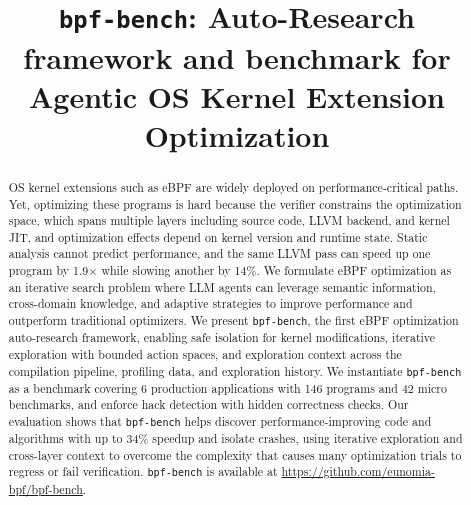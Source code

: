 \documentclass[sigplan,10pt,anonymous,nonacm]{acmart}
\newcommand{\sys}{\texttt{bpf-bench}\xspace}
\begin{document}
\title{\sys: Auto-Research framework and benchmark for Agentic OS Kernel Extension Optimization}


\begin{abstract}
OS kernel extensions such as eBPF are widely deployed on performance-critical paths.
Yet, optimizing these programs is hard because the verifier constrains the optimization space, which spans multiple layers including source code, LLVM backend, and kernel JIT, and optimization effects depend on kernel version and runtime state.
Static analysis cannot predict performance, and the same LLVM pass can speed up one program by 1.9$\times$ while slowing another by 14\%.
We formulate eBPF optimization as an iterative search problem where LLM agents can leverage semantic information, cross-domain knowledge, and adaptive strategies to improve performance and outperform traditional optimizers.
We present \sys, the first eBPF optimization auto-research framework, enabling safe isolation for kernel modifications, iterative exploration with bounded action spaces, and exploration context across the compilation pipeline, profiling data, and exploration history.
We instantiate \sys as a benchmark covering 6 production applications with 146 programs and 42 micro benchmarks, and enforce hack detection with hidden correctness checks.
Our evaluation shows that \sys helps discover performance-improving code and algorithms with up to 34\% speedup and isolate crashes, using iterative exploration and cross-layer context to overcome the complexity that causes many optimization trials to regress or fail verification.
\sys is available at \url{https://github.com/eunomia-bpf/bpf-bench}.
\end{abstract}
\end{document}
